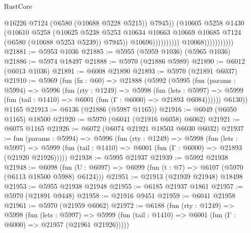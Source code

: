 \begin{lexlean}{RustCore}
\begin{coremodule}
                                                @16226
                                                @7124
                                                (@6580 (@10688 @5228 @5215))
                                                @7945))
                                            (@10605
                                              @5258
                                              @1430
                                              (@10610
                                                @5258
                                                (@10625
                                                  @5238
                                                  @5253
                                                  @10634
                                                  @10663
                                                  @10669
                                                  @10685
                                                  @7124
                                                  (@6580 (@10688 @5253 @5239))
                                                  @7945))
                                              @10696))))))))))
                          @10068)))))))))))
@21881 := @5953 @1036
@21885 := @5955 (@5959 @1036) (@5965 @1036)
@21886 := @5974 @18497
@21888 := @5970 (@21886 @5989)
@21890 := @6012 (@6013 @1036)
@21891 := @6008 @21890
@21893 := @5970 (@21891 @6037)
@21910 := @5969
    (fun (fn : @60) =>
    @21888
      (@5992
        (@5995
          (fun (params : @5994) =>
          @5996
            (fun (rty : @1249) =>
            @5998
              (fun (lets : @5997) =>
              @5999 (fun (tail : @1410) => @6001 (fun (Γ : @6000) => @21893 @6084))))))
        @6130))
    @1165
@21913 := @6136 (@21886 (@5987 @1165))
@21916 := @6049 (@6050 @1165) @18500
@21920 := @5970 (@6041 (@21916 @6058) @6062)
@21921 := @6075 @1165
@21926 := @6072 (@6074 @21921 @18503 @6030 @6032)
@21937 := fun (params : @5994) =>
  @5996
    (fun (rty : @1249) =>
    @5998
      (fun (lets : @5997) =>
      @5999 (fun (tail : @1410) => @6001 (fun (Γ : @6000) => @21893 (@21920 @21926)))))
@21938 := @5995 @21937
@21939 := @5992 @21938
@21948 := @6098
    (fun (U : @6097) => @6099 (fun (t : @7) => @6107 (@5970 (@6113 @18500 @5988) @6124)))
@21951 := @21913 (@21939 @21948) @18498
@21953 := @5955 @21938 @21948
@21955 := @6185 @21937 @1861
@21957 := @5970 (@21891 @9448)
@21958 := @21916 @9451
@21959 := @6041 @21958
@21961 := @5970 (@21959 @6062)
@21972 := @6188
    (fun (rty : @1249) =>
    @5998
      (fun (lets : @5997) =>
      @5999 (fun (tail : @1410) => @6001 (fun (Γ : @6000) => @21957 (@21961 @21926)))))

\end{coremodule}
\end{lexlean}
